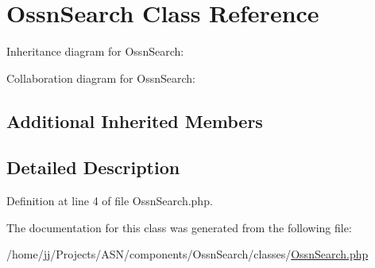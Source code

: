 \hypertarget{class_ossn_search}{}\section{Ossn\+Search Class Reference}
\label{class_ossn_search}


Inheritance diagram for Ossn\+Search\+:


Collaboration diagram for Ossn\+Search\+:
\subsection*{Additional Inherited Members}


\subsection{Detailed Description}


Definition at line 4 of file Ossn\+Search.\+php.



The documentation for this class was generated from the following file\+:\begin{DoxyCompactItemize}
\item 
/home/jj/\+Projects/\+A\+S\+N/components/\+Ossn\+Search/classes/\hyperlink{_ossn_search_8php}{Ossn\+Search.\+php}\end{DoxyCompactItemize}
